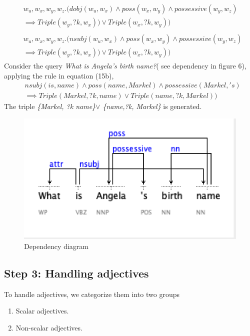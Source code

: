 \documentclass[review]{elsarticle}
\begin{document}
\begin{subequations}
\begin{align}
\begin{split}
    &w_u,w_x,w_y,w_z.(dobj(w_u,w_x)\land poss(w_x,w_y)\land possessive(w_y,w_z)\\
 &\implies Triple(w_y,?k, w_x ))\lor Triple(w_x,?k, w_y))
\end{split}\\
\begin{split}
   &w_u,w_x,w_y,w_z.(nsubj(w_u,w_x)\land poss(w_x,w_y)\land possessive(w_y,w_z)\\
 &\implies Triple(w_y,?k, w_x ))\lor Triple(w_x,?k, w_y))
\end{split}
\end{align}
\end{subequations}
Consider the query \textit{ What is Angela's birth name?}( see dependency in figure 6), applying the rule in equation (15b),
\begin{equation*}
\begin{split}
 &nsubj(is,name)\land poss(name,Markel)\land possessive(Markel,'s)\\
 &\implies Triple(Markel,?k, name )\lor Triple(name,?k, Markel))
 \end{split}
\end{equation*}
 The triple \textit{\{Markel, ?k name\}$\lor$ \{name,?k, Markel\}} is generated.
 \begin{figure}[h]
	\centering
		\includegraphics[scale=0.7,angle=0]{angel.png}
		\caption{Dependency diagram }
	\label{fig:example2}
\end{figure}
\subsection{Step 3: Handling adjectives}
To handle adjectives, we categorize them into two groups
\begin{enumerate}
\item Scalar adjectives.
\item Non-scalar adjectives.
\end{enumerate}
\end{document}
